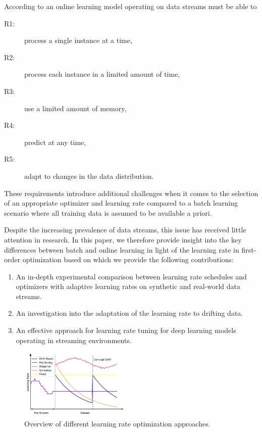 \documentclass[letterpaper]{article} %
\begin{document}
According to \citet{bifetMOAMassiveOnline2010} an online learning model operating on data streams must be able to
\begin{center}
	\begin{varwidth}{0.5\textwidth}
		\begin{description}
			\item[R1:] process a single instance at a time,\label{rq:single_instance}
			\item[R2:] process each instance in a limited amount of time,\label{rq:limited_time}
			\item[R3:] use a limited amount of memory,\label{rq:limited_memory}
			\item[R4:] predict at any time,\label{rq:predict_any_time}
			\item[R5:] adapt to changes in the data distribution.\label{rq:adapt_to_drift}
		\end{description}
	\end{varwidth}
\end{center}

These requirements introduce additional challenges when it comes to the selection of an appropriate optimizer and learning rate compared to a batch learning scenario where all training data is assumed to be available a priori.

Despite the increasing prevalence of data streams, this issue has received little attention in research.
In this paper, we therefore provide insight into the key differences between batch and online learning in light of the learning rate in first-order optimization based on which we provide the following contributions:

\begin{enumerate}
	\item An in-depth experimental comparison between learning rate schedules and optimizers with adaptive learning rates on synthetic and real-world data streams.
	\item An investigation into the adaptation of the learning rate to drifting data.
	\item An effective approach for learning rate tuning for deep learning models operating in streaming environments.
\end{enumerate}

\begin{figure}
	\centering
	\includegraphics[width=0.474\textwidth]{figures/lr_overview.pdf}
	\caption{Overview of different learning rate optimization approaches.}
	\label{fig:lr_overview}
\end{figure}
\end{document}
